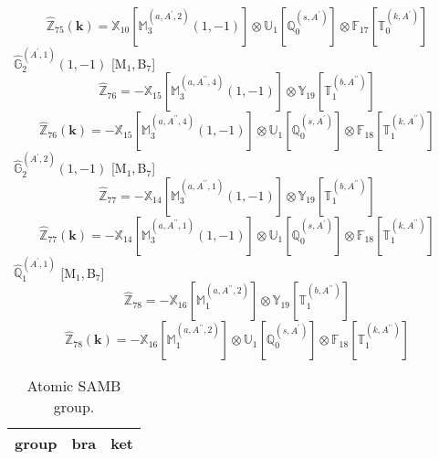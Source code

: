 \documentclass[fleqn,10pt,landscape]{article}
\begin{document}
\begin{itemize}
\begin{dmath*}
\end{dmath*}
\begin{dmath*}
\hat{\mathbb{Z}}_{75}(\bm{k})=\mathbb{X}_{10}[\mathbb{M}_{3}^{(a,A^{\prime},2)}(1,-1)] \otimes\mathbb{U}_{1}[\mathbb{Q}_{0}^{(s,A^{\prime})}] \otimes\mathbb{F}_{17}[\mathbb{T}_{0}^{(k,A^{\prime})}]
\end{dmath*}
\vspace{4mm}
\noindent {} $\,\,\,\hat{\mathbb{G}}_{2}^{(A^{\prime},1)}(1,-1)$ [M$_{1}$,\,B$_{7}$]
\begin{dmath*}
\hat{\mathbb{Z}}_{76}=- \mathbb{X}_{15}[\mathbb{M}_{3}^{(a,A^{\prime\prime},4)}(1,-1)] \otimes\mathbb{Y}_{19}[\mathbb{T}_{1}^{(b,A^{\prime\prime})}]
\end{dmath*}
\begin{dmath*}
\hat{\mathbb{Z}}_{76}(\bm{k})=- \mathbb{X}_{15}[\mathbb{M}_{3}^{(a,A^{\prime\prime},4)}(1,-1)] \otimes\mathbb{U}_{1}[\mathbb{Q}_{0}^{(s,A^{\prime})}] \otimes\mathbb{F}_{18}[\mathbb{T}_{1}^{(k,A^{\prime\prime})}]
\end{dmath*}
\vspace{4mm}
\noindent {} $\,\,\,\hat{\mathbb{G}}_{2}^{(A^{\prime},2)}(1,-1)$ [M$_{1}$,\,B$_{7}$]
\begin{dmath*}
\hat{\mathbb{Z}}_{77}=- \mathbb{X}_{14}[\mathbb{M}_{3}^{(a,A^{\prime\prime},1)}(1,-1)] \otimes\mathbb{Y}_{19}[\mathbb{T}_{1}^{(b,A^{\prime\prime})}]
\end{dmath*}
\begin{dmath*}
\hat{\mathbb{Z}}_{77}(\bm{k})=- \mathbb{X}_{14}[\mathbb{M}_{3}^{(a,A^{\prime\prime},1)}(1,-1)] \otimes\mathbb{U}_{1}[\mathbb{Q}_{0}^{(s,A^{\prime})}] \otimes\mathbb{F}_{18}[\mathbb{T}_{1}^{(k,A^{\prime\prime})}]
\end{dmath*}
\vspace{4mm}
\noindent {} $\,\,\,\hat{\mathbb{Q}}_{1}^{(A^{\prime},1)}$ [M$_{1}$,\,B$_{7}$]
\begin{dmath*}
\hat{\mathbb{Z}}_{78}=- \mathbb{X}_{16}[\mathbb{M}_{1}^{(a,A^{\prime\prime},2)}] \otimes\mathbb{Y}_{19}[\mathbb{T}_{1}^{(b,A^{\prime\prime})}]
\end{dmath*}
\begin{dmath*}
\hat{\mathbb{Z}}_{78}(\bm{k})=- \mathbb{X}_{16}[\mathbb{M}_{1}^{(a,A^{\prime\prime},2)}] \otimes\mathbb{U}_{1}[\mathbb{Q}_{0}^{(s,A^{\prime})}] \otimes\mathbb{F}_{18}[\mathbb{T}_{1}^{(k,A^{\prime\prime})}]
\end{dmath*}
\begin{center}
\renewcommand{\arraystretch}{1.3}
\begin{longtable}{c|c|c}
\caption{Atomic SAMB group.}
 \\
 \hline \hline
group & bra & ket \\ \hline \endfirsthead


\end{longtable}
\end{center}
\end{itemize}
\end{document}
